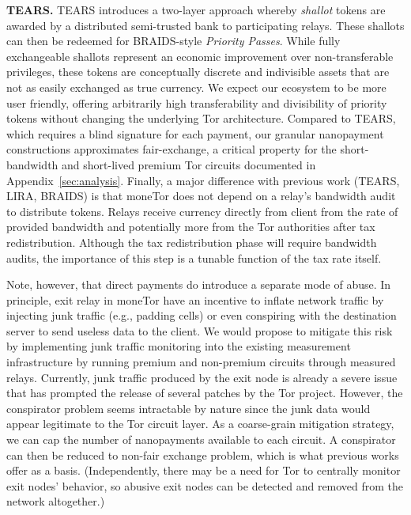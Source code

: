 \medskip\noindent\textbf{TEARS.}
TEARS introduces a two-layer approach whereby \emph{shallot} tokens are awarded by a distributed semi-trusted bank to participating relays.
These shallots can then be redeemed for BRAIDS-style \emph{Priority Passes}.
While fully exchangeable shallots represent an economic improvement over non-transferable privileges, these tokens are conceptually discrete and indivisible assets that are not as easily exchanged as true currency.
We expect our ecosystem to be more user friendly, offering arbitrarily high transferability and divisibility of priority tokens without changing the underlying Tor architecture.
Compared to TEARS, which requires a blind signature for each payment, our granular nanopayment constructions approximates fair-exchange, a critical property for the short-bandwidth and short-lived premium Tor circuits documented in Appendix~\ref{sec:analysis}.
Finally, a major difference with previous work (TEARS, LIRA, BRAIDS) is that moneTor does not depend on a relay's bandwidth audit to distribute tokens.
Relays receive currency directly from client from the rate of provided bandwidth and potentially more from the Tor authorities after tax redistribution.
Although the tax redistribution phase will require bandwidth audits, the importance of this step is a tunable function of the tax rate itself.

Note, however, that direct payments do introduce a separate mode of abuse.
In principle, exit relay in moneTor have an incentive to inflate network traffic by injecting junk traffic (e.g., padding cells) or even conspiring with the destination server to send useless data to the client.
We would propose to mitigate this risk by implementing junk traffic monitoring into the existing measurement infrastructure by running premium and non-premium circuits through measured relays.
Currently, junk traffic produced by the exit node is already a severe issue~\cite{rochet2018dropping} that has prompted the release of several patches by the Tor project.
However, the conspirator problem seems intractable by nature since the junk data would appear legitimate to the Tor circuit layer.
As a coarse-grain mitigation strategy, we can cap the number of nanopayments available to each circuit.
A conspirator can then be reduced to non-fair exchange problem, which is what previous works offer as a basis.
(Independently, there may be a need for Tor to centrally monitor exit nodes' behavior, so abusive exit nodes can be detected and removed from the network altogether.)

